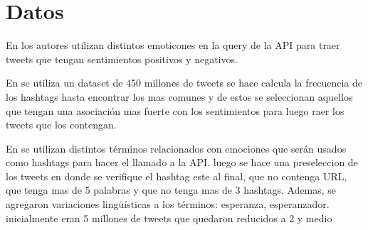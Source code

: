 \chapter{Datos}

En \cite{pak2010twitter} los autores utilizan distintos emoticones en la query de la API para traer tweets que tengan sentimientos positivos y negativos. 

En \cite{davidov2010enhanced} se utiliza un dataset de 450 millones de tweets se hace calcula la frecuencia de los hashtags hasta encontrar los mas comunes y de estos se seleccionan aquellos que tengan una asociación mas fuerte con los sentimientos para luego raer los tweets que los contengan.


En \cite{wang2012harnessing} se utilizan distintos términos relacionados con emociones que serán usados como hashtags para hacer el llamado a la API. luego se hace una preseleccion de los tweets en donde se verifique el hashtag este al final, que no contenga URL, que tenga mas de 5 palabras y que no tenga mas de 3 hashtags. Ademas, se agregaron variaciones lingüísticas a los términos: esperanza, esperanzador. inicialmente eran 5 millones de tweets que quedaron reducidos a 2 y medio
